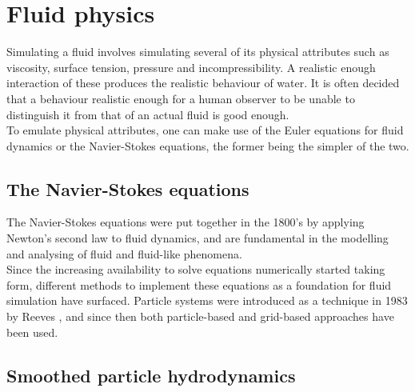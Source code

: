 \documentclass[paper=a4, fontsize=11pt]{report}
\numberwithin{equation}{section} %
\numberwithin{figure}{section} %
\numberwithin{table}{section} %
\begin{document}

\chapter{Fluid physics}

Simulating a fluid involves simulating several of its physical attributes such as viscosity, surface tension, pressure and incompressibility. A realistic enough interaction of these produces the realistic behaviour of water. It is often decided that a behaviour realistic enough for a human observer to be unable to distinguish it from that of an actual fluid is good enough. \\

To emulate physical attributes, one can make use of the Euler equations for fluid dynamics or the Navier-Stokes equations, the former being the simpler of the two. 

\section{The Navier-Stokes equations}
The Navier-Stokes equations were put together in the 1800's by applying Newton's second law to fluid dynamics, and are fundamental in the modelling and analysing of fluid and fluid-like phenomena. \\

 
Since the increasing availability to solve equations numerically started taking form, different methods to implement these equations as a foundation for fluid simulation have surfaced. Particle systems were introduced as a technique in 1983 by Reeves \cite{reeves}, and since then both particle-based and grid-based approaches have been used. 

\section{Smoothed particle hydrodynamics}
\end{document}
